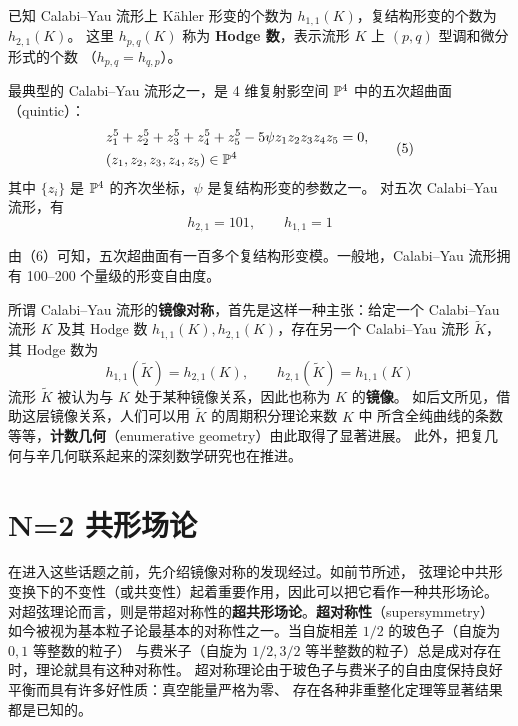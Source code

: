 已知 Calabi--Yau 流形上 Kähler 形变的个数为 $h_{1,1}(K)$，复结构形变的个数为 $h_{2,1}(K)$。
这里 $h_{p,q}(K)$ 称为 \textbf{Hodge 数}，表示流形 $K$ 上 $(p,q)$ 型调和微分形式的个数
（$h_{p,q}=h_{q,p}$）。

最典型的 Calabi--Yau 流形之一，是 4 维复射影空间 $\mathbb{P}^4$ 中的五次超曲面
（quintic）：
\begin{equation}
  \begin{aligned}
    & z_1^5+z_2^5+z_3^5+z_4^5+z_5^5-5\psi z_1z_2z_3z_4z_5=0,\\
    & (z_1,z_2,z_3,z_4,z_5)\in \mathbb{P}^4
  \end{aligned} \tag{5}
\end{equation}
其中 $\{z_i\}$ 是 $\mathbb{P}^4$ 的齐次坐标，$\psi$ 是复结构形变的参数之一。
对五次 Calabi--Yau 流形，有
\begin{equation}
  h_{2,1}=101,\qquad h_{1,1}=1 \tag{6}
\end{equation}

由（6）可知，五次超曲面有一百多个复结构形变模。一般地，Calabi--Yau 流形拥有
100--200 个量级的形变自由度。

所谓 Calabi--Yau 流形的\textbf{镜像对称}，首先是这样一种主张：给定一个 Calabi--Yau 流形
$K$ 及其 Hodge 数 $h_{1,1}(K),h_{2,1}(K)$，存在另一个 Calabi--Yau 流形 $\tilde K$，
其 Hodge 数为
\begin{equation}
  h_{1,1}(\tilde K)=h_{2,1}(K),\qquad h_{2,1}(\tilde K)=h_{1,1}(K) \tag{7}
\end{equation}
流形 $\tilde K$ 被认为与 $K$ 处于某种镜像关系，因此也称为 $K$ 的\textbf{镜像}。
如后文所见，借助这层镜像关系，人们可以用 $\tilde K$ 的周期积分理论来数 $K$ 中
所含全纯曲线的条数等等，\textbf{计数几何}（enumerative geometry）由此取得了显著进展。
此外，把复几何与辛几何联系起来的深刻数学研究也在推进。

\section*{N=2 共形场论}

在进入这些话题之前，先介绍镜像对称的发现经过。如前节所述，
弦理论中共形变换下的不变性（或共变性）起着重要作用，因此可以把它看作一种共形场论。
对超弦理论而言，则是带超对称性的\textbf{超共形场论}。\textbf{超对称性}（supersymmetry）
如今被视为基本粒子论最基本的对称性之一。当自旋相差 $1/2$ 的玻色子（自旋为 $0,1$ 等整数的粒子）
与费米子（自旋为 $1/2,3/2$ 等半整数的粒子）总是成对存在时，理论就具有这种对称性。
超对称理论由于玻色子与费米子的自由度保持良好平衡而具有许多好性质：真空能量严格为零、
存在各种非重整化定理等显著结果都是已知的。

